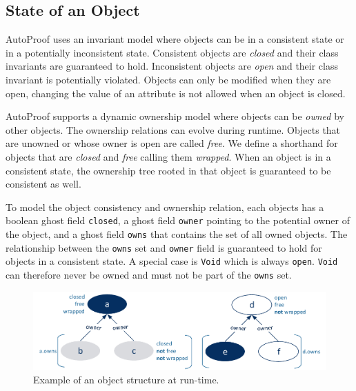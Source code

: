 \documentclass[a4paper,12pt]{article}
\newcommand{\AutoProof}{Auto\-Proof\xspace}
\newcommand{\e}[1]{\mbox{\lstinline[language=Eiffel]|#1|}}
\begin{document}
\subsection{State of an Object}


\AutoProof uses an invariant model where objects can be in a consistent state or in a potentially inconsistent state. Consistent objects are \emph{closed} and their class invariants are guaranteed to hold. Inconsistent objects are \emph{open} and their class invariant is potentially violated. Objects can only be modified when they are open, changing the value of an attribute is not allowed when an object is closed.

\AutoProof supports a dynamic ownership model where objects can be \emph{owned} by other objects. The ownership relations can evolve during runtime. Objects that are unowned or whose owner is open are called \emph{free}. We define a shorthand for objects that are \emph{closed} and \emph{free} calling them \emph{wrapped}. When an object is in a consistent state, the ownership tree rooted in that object is guaranteed to be consistent as well.

To model the object consistency and ownership relation, each objects has a boolean ghost field \e{closed}, a ghost field \e{owner} pointing to the potential owner of the object, and a ghost field \e{owns} that contains the set of all owned objects. The relationship between the \e{owns} set and \e{owner} field is guaranteed to hold for objects in a consistent state. A special case is \e{Void} which is always \e{open}. \e{Void} can therefore never be owned and must not be part of the \e{owns} set.

\begin{figure}[!htb]
\begin{center}
\includegraphics[width=\columnwidth]{objectstate.pdf}
\end{center}
\caption{Example of an object structure at run-time.} 
\label{fig:objectstate}
\end{figure}
\end{document}
